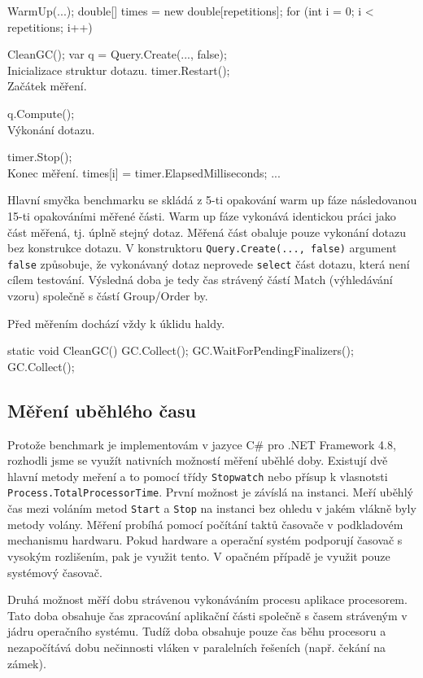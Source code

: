 \begin{code}
WarmUp(...);
double[] times = new double[repetitions];
for (int i = 0; i < repetitions; i++) {
    CleanGC();
    var q = Query.Create(..., false);  \\ Inicializace struktur dotazu.
    timer.Restart();  \\ Začátek měření.

    q.Compute();      \\ Výkonání dotazu.
    
    timer.Stop();     \\ Konec měření. 
    times[i] = timer.ElapsedMilliseconds;
    ...
}
\end{code}

Hlavní smyčka benchmarku se skládá z 5-ti opakování warm up fáze následovanou 15-ti opakováními měřené části.
Warm up fáze vykonává identickou práci jako část měřená, tj. úplně stejný dotaz. 
Měřená část obaluje pouze vykonání dotazu bez konstrukce dotazu. 
V konstruktoru \verb+Query.Create(..., false)+ argument \verb+false+ způsobuje, že vykonávaný dotaz neprovede \verb+select+ část dotazu, která není cílem testování.
Výsledná doba je tedy čas strávený částí Match (výhledávání vzoru) společně s částí Group/Order by. 

Před měřením dochází vždy k úklidu haldy. 
\begin{code}
static void CleanGC()
{
    GC.Collect();
    GC.WaitForPendingFinalizers();
    GC.Collect();
}
\end{code}

\subsection{Měření uběhlého času}

Protože benchmark je implementovám v jazyce C\# pro .NET Framework 4.8, rozhodli jsme se využít nativních možností měření uběhlé doby.
Existují dvě hlavní metody meření a to pomocí třídy \texttt{Stopwatch} nebo přísup k vlasnotsti \texttt{Process.TotalProcessorTime}.
První možnost je závíslá na instanci.
Meří uběhlý čas mezi voláním metod \texttt{Start} a \texttt{Stop} na instanci bez ohledu v jakém vlákně byly metody volány.
Měření probíhá pomocí počítání taktů časovače v podkladovém mechanismu hardwaru.
Pokud hardware a operační systém podporují časovač s vysokým rozlišením, pak je využit tento.
V opačném případě je využit pouze systémový časovač. 

Druhá možnost měří dobu strávenou vykonáváním procesu aplikace procesorem.
Tato doba obsahuje čas zpracování aplikační části společně s časem stráveným v jádru operačního systému.
Tudíž doba obsahuje pouze čas běhu procesoru a nezapočítává dobu nečinnosti vláken v paralelních řešeních (např. čekání na zámek).

